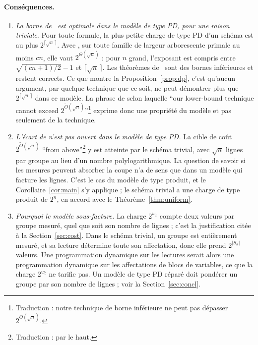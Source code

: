 \documentclass[11pt,a4paper]{article}
\makeatletter
\theoremstyle{definition}
\theoremstyle{remark}
\newcommand{\englishhyph}{\@ifundefined{l@english}{}{\language\l@english}}
\newcommand{\eng}[1]{{\englishhyph #1}}
\makeatother
\begin{document}
\paragraph{Conséquences.}
\begin{enumerate}
\item \emph{La borne de~\cite{DL} est optimale dans le modèle de type PD, pour une raison
 triviale.} Pour toute formule, la plus petite charge de type PD d'un schéma est au plus
 $2^{\lceil\sqrt n\,\rceil}$. Avec \cite[Théorème~8.1]{DL}, sur toute famille de largeur
 arborescente primale au moins $cn$, elle vaut $2^{\Theta(\sqrt n)}$ : pour $n$ grand,
 l'exposant est compris entre $\sqrt{(cn+1)/2}-1$ et $\lceil\sqrt n\,\rceil$. Les théorèmes
 de~\cite{DL} sont des bornes inférieures et restent corrects. Ce que montre la
 Proposition~\ref{prop:dp}, c'est qu'aucun argument, par quelque technique que ce soit, ne
 peut démontrer plus que $2^{\lceil\sqrt n\,\rceil}$ dans ce modèle. La phrase de
 \cite[Section~9]{DL} selon laquelle \eng{``our lower-bound technique cannot exceed
 $2^{\tilde O(\sqrt n)}$''}\footnote{Traduction : \og notre technique de borne inférieure
 ne peut pas dépasser $2^{\tilde O(\sqrt n)}$\fg{}.} exprime donc une propriété du modèle et
 pas seulement de la technique.
\item \emph{L'écart de \cite[Section~9]{DL} n'est pas ouvert dans le modèle de type PD.} La
 cible de coût $2^{\tilde O(\sqrt n)}$ \eng{``from above''}\footnote{Traduction : \og par
 le haut\fg{}.} y est atteinte par le schéma trivial, avec $\sqrt n$ lignes par groupe au
 lieu d'un nombre polylogarithmique. La question de savoir si les mesures peuvent absorber
 la coupe n'a de sens que dans un modèle qui facture les lignes. C'est le cas du modèle de
 type produit, et le Corollaire~\ref{cor:main} s'y applique ; le schéma trivial a une
 charge de type produit de $2^n$, en accord avec le Théorème~\ref{thm:uniform}.
\item \emph{Pourquoi le modèle sous-facture.} La charge $2^{w_t}$ compte deux valeurs par
 groupe mesuré, quel que soit son nombre de lignes ; c'est la justification citée à la
 Section~\ref{sec:cost}. Dans le schéma trivial, un groupe est entièrement mesuré, et sa
 lecture détermine toute son affectation, donc elle prend $2^{|S_h|}$ valeurs. Une
 programmation dynamique sur les lectures serait alors une programmation dynamique sur les
 affectations de blocs de variables, ce que la charge $2^{w_t}$ ne tarifie pas. Un modèle
 de type PD réparé doit pondérer un groupe par son nombre de lignes ; voir la
 Section~\ref{sec:concl}.
\end{enumerate}
\end{document}
